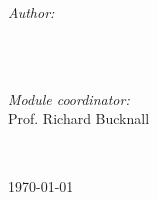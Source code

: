 \begin{titlepage}
  \begin{minipage}{0.4\textwidth}
    \begin{flushleft} \large
      \emph{Author:}\\
      \@author %
      \\[1.2em]
    \end{flushleft}
  \end{minipage}
  ~
  \begin{minipage}{0.4\textwidth}
    \begin{flushright} \large
      \emph{Module coordinator:} \\
      Prof. Richard Bucknall \\[1.2em] %
    \end{flushright}
  \end{minipage}\\[2cm]
  \makeatother



  {\large \today}\\[2cm] %

  \vfill %

\end{titlepage}